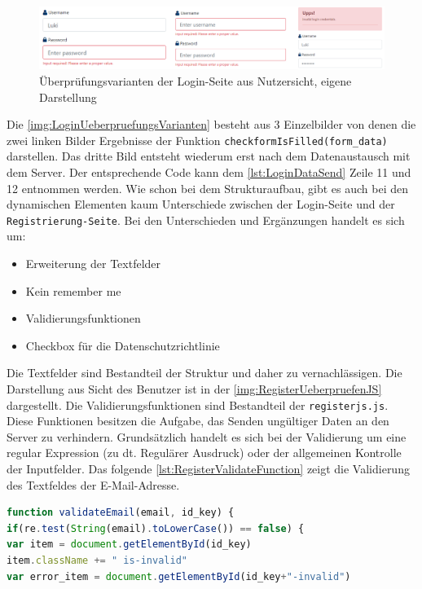 \documentclass[a4paper,titlepage,halfparskip,12pt]{scrreprt}
\begin{document}
\begin{onehalfspacing}
\begin{figure}[h]
	\centering
	\includegraphics[width=\linewidth]{images/LoginUeberpruefungJSGesamt}
	\caption{Überprüfungsvarianten der Login-Seite aus Nutzersicht, eigene Darstellung}
	\label{img:LoginUeberpruefungsVarianten}
\end{figure}
Die \autoref{img:LoginUeberpruefungsVarianten} besteht aus 3 Einzelbilder von denen die zwei linken Bilder Ergebnisse der Funktion \texttt{checkformIsFilled(form\_data)} darstellen. Das dritte Bild entsteht wiederum erst nach dem Datenaustausch mit dem Server. Der entsprechende Code kann dem \autoref{lst:LoginDataSend} Zeile 11 und 12 entnommen werden. Wie schon bei dem Strukturaufbau, gibt es auch bei den dynamischen Elementen kaum Unterschiede zwischen der Login-Seite und der \texttt{Registrierung-Seite}.
Bei den Unterschieden und Ergänzungen handelt es sich um:
\begin{itemize}
	\item Erweiterung der Textfelder
	\item Kein \glqq remember me\grqq\
	\item Validierungsfunktionen
	\item Checkbox für die Datenschutzrichtlinie
\end{itemize}
Die Textfelder sind Bestandteil der Struktur und daher zu vernachlässigen. Die Darstellung aus Sicht des Benutzer ist in der \autoref{img:RegisterUeberpruefenJS} dargestellt. Die Validierungsfunktionen sind Bestandteil der \texttt{registerjs.js}. Diese Funktionen besitzen die Aufgabe, das Senden ungültiger Daten an den Server zu verhindern. Grundsätzlich handelt es sich bei der Validierung um eine regular Expression (zu dt. Regulärer Ausdruck) oder der allgemeinen Kontrolle der Inputfelder. Das folgende \autoref{lst:RegisterValidateFunction} zeigt die Validierung des Textfeldes der E-Mail-Adresse.
\begin{lstlisting}[language=Javascript,caption=Validierungsfunktion \texttt{validateEmail()},label={lst:RegisterValidateFunction}]
function validateEmail(email, id_key) {
if(re.test(String(email).toLowerCase()) == false) {
var item = document.getElementById(id_key)
item.className += " is-invalid"
var error_item = document.getElementById(id_key+"-invalid")

\end{lstlisting}
\end{onehalfspacing}
\end{document}
